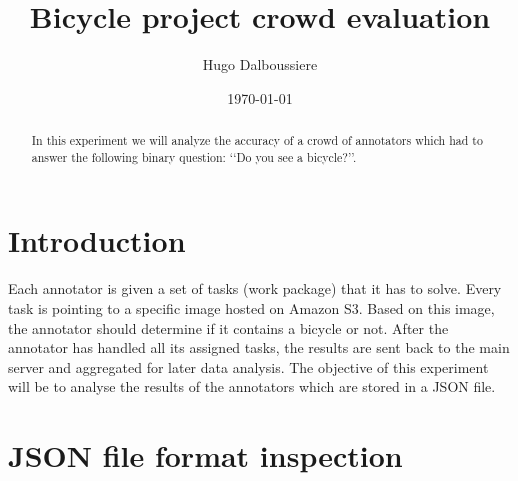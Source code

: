 \documentclass[letterpaper,12pt]{article}
\begin{document}
\title{Bicycle project crowd evaluation}
\author{Hugo Dalboussiere}
\date{\today}
\maketitle

\begin{abstract}
In this experiment we will analyze the accuracy of a crowd of annotators which had to answer the following binary question: ‘‘Do you see a bicycle?’’.
\end{abstract}


\section{Introduction}

Each annotator is given a set of tasks (work package) that it has to solve. Every task is pointing to a specific image hosted on Amazon S3. Based on this image, the annotator should determine if it contains a bicycle or not. After the annotator has handled all its assigned tasks, the results are sent back to the main server and aggregated for later data analysis. The objective of this experiment will be to analyse the results of the annotators which are stored in a JSON file.

\newpage

\section{JSON file format inspection}
\end{document}
